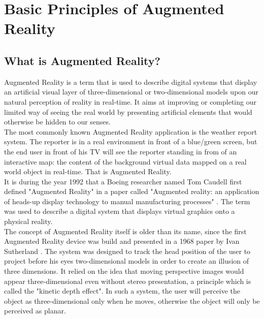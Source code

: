 \chapter{Basic Principles of Augmented Reality}
\label{cha:basic_principles}

\section{What is Augmented Reality?}
\label{sec:what_is_ar}

Augmented Reality is a term that is used to describe digital systems that display an artificial visual layer of three-dimensional or two-dimensional models upon our natural perception of reality in real-time. It aims at improving or completing our limited way of seeing the real world by presenting artificial elements that would otherwise be hidden to our senses.\\

The most commonly known Augmented Reality application is the weather report system. The reporter is in a real environment in front of a blue/green screen, but the end user in front of his TV will see the reporter standing in from of an interactive map: the content of the background virtual data mapped on a real world object in real-time. That is Augmented Reality. \\

It is during the year 1992 that a Boeing researcher named Tom Caudell first defined "Augmented Reality" in a paper called "Augmented reality: an application of heads-up display technology to manual manufacturing processes" \cite{Cau92}. The term was used to describe a digital system that displays virtual graphics onto a physical reality.\\

The concept of Augmented Reality itself is older than its name, since the first Augmented Reality device was build and presented in a 1968 paper by Ivan Sutherland \cite{Sut68}. The system was designed to track the head position of the user to project before his eyes two-dimensional models in order to create an illusion of three dimensions. It relied on the idea that moving perspective images would appear three-dimensional even without stereo presentation, a principle which is called the "kinetic depth effect". In such a system, the user will perceive the object as three-dimensional only when he moves, otherwise the object will only be perceived as planar.\\


